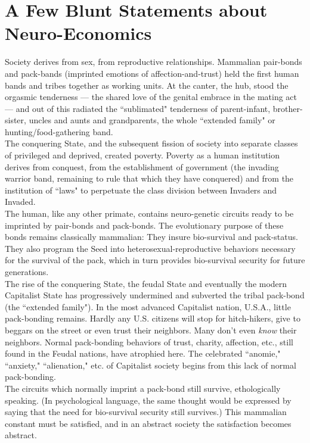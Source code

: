 \chapter{A Few Blunt Statements about Neuro-Economics}

Society derives from sex, from reproductive relationships. Mammalian pair-bonds and pack-bands (imprinted emotions of affection-and-trust) held the first human bands and tribes together as working units. At the canter, the hub, stood the orgasmic tenderness --- the shared love of the genital embrace in the mating act --- and out of this radiated the ``sublimated" tenderness of parent-infant, brother-sister, uncles and aunts and grandparents, the whole ``extended family" or hunting/food-gathering band.\\
The conquering State, and the subsequent fission of society into separate classes of privileged and deprived, created poverty. Poverty as a human institution derives from conquest, from the establishment of government (the invading warrior band, remaining to rule that which they have conquered) and from the institution of ``laws" to perpetuate the class division between Invaders and Invaded.\\
The human, like any other primate, contains neuro-genetic circuits ready to be imprinted by pair-bonds and pack-bonds. The evolutionary purpose of these bonds remains classically mammalian: They insure bio-survival and pack-status. They also program the Seed into heterosexual-reproductive behaviors necessary for the survival of the pack, which in turn provides bio-survival security for future generations.\\
The rise of the conquering State, the feudal State and eventually the modern Capitalist State has progressively undermined and subverted the tribal pack-bond (the ``extended family"). In the most advanced Capitalist nation, U.S.A., little pack-bonding remains. Hardly any U.S. citizens will stop for hitch-hikers, give to beggars on the street or even trust their neighbors. Many don't even \emph{know} their neighbors. Normal pack-bonding behaviors of trust, charity, affection, etc., still found in the Feudal nations, have atrophied here. The celebrated ``anomie," ``anxiety," ``alienation," etc. of Capitalist society begins from this lack of normal pack-bonding.\\
The circuits which normally imprint a pack-bond still survive, ethologically speaking. (In psychological language, the same thought would be expressed by saying that the need for bio-survival security still survives.) This mammalian constant must be satisfied, and in an abstract society the satisfaction becomes abstract.\\
